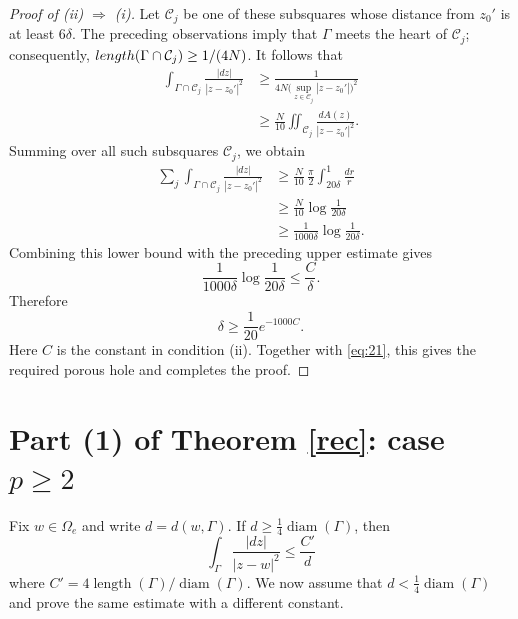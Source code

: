\documentclass[11pt]{article}
\numberwithin{equation}{section}
\theoremstyle{remark}
\newcommand{\diam}{\operatorname{diam}}
\begin{document}
\begin{proof}[Proof of {\rm (ii) $\Rightarrow$ (i)}]
Let \(\mathcal C_j\) be one of these subsquares whose distance from
\(z_0'\) is at least \(6\delta\). The preceding observations imply that
\(\Gamma\) meets the heart of \(\mathcal C_j\); consequently,
\({\rm length}(\Gamma\cap\mathcal C_j)\ge1/(4N)\). It follows that
\[
\begin{aligned}
 \int_{\Gamma\cap\mathcal C_j}
 \frac{|dz|}{|z-z_0'|^2}
 &\ge
 \frac{1}
 {4N\bigl(\sup_{z\in\mathcal C_j}|z-z_0'|\bigr)^2} \\
 &\ge
 \frac{N}{10}
 \iint_{\mathcal C_j}
 \frac{dA(z)}{|z-z_0'|^2}.
\end{aligned}
\]
Summing over all such subsquares \(\mathcal C_j\), we obtain
\[
\begin{aligned}
 \sum_j\int_{\Gamma\cap\mathcal C_j}
 \frac{|dz|}{|z-z_0'|^2}
 &\ge
 \frac{N}{10}\,\frac{\pi}{2}
 \int_{20\delta}^{1}\frac{dr}{r} \\
 &\ge
 \frac{N}{10}\log\frac{1}{20\delta} \\
 &\ge
 \frac{1}{1000\delta}
 \log\frac{1}{20\delta}.
\end{aligned}
\]
Combining this lower bound with the preceding upper estimate gives
\[
 \frac{1}{1000\delta}
 \log\frac{1}{20\delta}
 \le\frac{C}{\delta}.
\]
Therefore
\[
 \delta\ge\frac1{20}e^{-1000C}.
\]
Here \(C\) is the constant in condition (ii). Together with
\eqref{eq:21}, this gives the required porous hole and completes the
proof.
\end{proof}

\section{Part (1) of Theorem \ref{rec}: case
\texorpdfstring{$p\geq 2$}{p >= 2}}\label{sec:bigp}
Fix $w\in\Omega_e$ and write $d=d(w,\Gamma)$.  If
$d\ge\frac14\diam(\Gamma)$, then
\begin{equation}\label{ddd}
    \int_{\Gamma}\frac{|dz|}{|z - w|^2} \leq \frac{C'}{d}
\end{equation}
where $C'=4\operatorname{length}(\Gamma)/\diam(\Gamma)$.  We now
assume that $d<\frac14\diam(\Gamma)$ and prove the same estimate with a
different constant.
\end{document}
